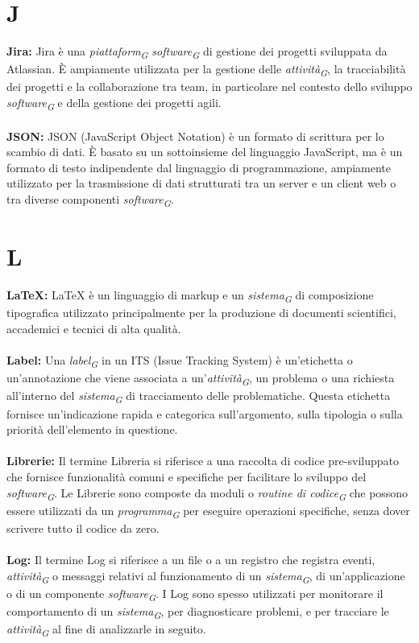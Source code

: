 \documentclass{article}
\begin{document}
\section*{J}
{}
\textbf{Jira:} Jira è una \textit{piattaform}\textsubscript{\textit{G}} \textit{software}\textsubscript{\textit{G}} di gestione dei progetti sviluppata da Atlassian. È ampiamente utilizzata per la gestione delle \textit{attività}\textsubscript{\textit{G}}, la tracciabilità dei progetti e la collaborazione tra team, in particolare nel contesto dello sviluppo \textit{software}\textsubscript{\textit{G}} e della gestione dei progetti agili.
\\
\\
\textbf{JSON:} JSON (JavaScript Object Notation) è un formato di scrittura per lo scambio di dati. È basato su un sottoinsieme del linguaggio JavaScript, ma è un formato di testo indipendente dal linguaggio di programmazione, ampiamente utilizzato per la trasmissione di dati strutturati tra un server e un client web o tra diverse componenti \textit{software}\textsubscript{\textit{G}}.
\pagebreak
\section*{L}
{}
\textbf{LaTeX:} LaTeX è un linguaggio di markup e un \textit{sistema}\textsubscript{\textit{G}} di composizione tipografica utilizzato principalmente per la produzione di documenti scientifici, accademici e tecnici di alta qualità.
\\
\\
\textbf{Label:} Una \textit{label}\textsubscript{\textit{G}} in un ITS (Issue Tracking System) è un'etichetta o un'annotazione che viene associata a un'\textit{attività}\textsubscript{\textit{G}}, un problema o una richiesta all'interno del \textit{sistema}\textsubscript{\textit{G}} di tracciamento delle problematiche. Questa etichetta fornisce un'indicazione rapida e categorica sull'argomento, sulla tipologia o sulla priorità dell'elemento in questione.
\\
\\
\textbf{Librerie:} Il termine Libreria si riferisce a una raccolta di codice pre-sviluppato che fornisce funzionalità comuni e specifiche per facilitare lo sviluppo del \textit{software}\textsubscript{\textit{G}}. Le Librerie sono composte da moduli o \textit{routine di codice}\textsubscript{\textit{G}} che possono essere utilizzati da un \textit{programma}\textsubscript{\textit{G}} per eseguire operazioni specifiche, senza dover scrivere tutto il codice da zero.
\\
\\
\textbf{Log:} Il termine Log si riferisce a un file o a un registro che registra eventi, \textit{attività}\textsubscript{\textit{G}} o messaggi relativi al funzionamento di un \textit{sistema}\textsubscript{\textit{G}}, di un'applicazione o di un componente \textit{software}\textsubscript{\textit{G}}. I Log sono spesso utilizzati per monitorare il comportamento di un \textit{sistema}\textsubscript{\textit{G}}, per diagnosticare problemi, e per tracciare le \textit{attività}\textsubscript{\textit{G}} al fine di analizzarle in seguito.
\pagebreak
\end{document}
